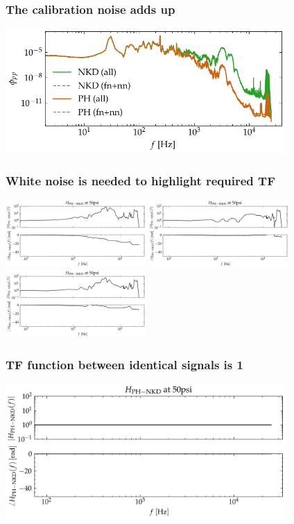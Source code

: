 \documentclass[aspectratio=169,9pt]{beamer}
\begin{document}
\begin{frame}
  \frametitle{The calibration noise adds up}
    \centering
    \includegraphics[width=0.8\textwidth]{sanity/50psi/PH-NKD/calib_spectra_50psi_nkd_fn_plus_nn.pdf}
\end{frame}

\begin{frame}
    \frametitle{White noise is needed to highlight required TF}
        \centering
        \includegraphics[width=0.4\textwidth]{sanity/50psi/PH-NKD/H_50psi_nn.png}
        \includegraphics[width=0.4\textwidth]{sanity/50psi/PH-NKD/H_50psi_fn.png}
        \includegraphics[width=0.4\textwidth]{sanity/50psi/PH-NKD/H_50psi_an.png}
\end{frame}

\begin{frame}
    \frametitle{TF function between identical signals is 1}
        \centering
        \includegraphics[width=0.8\textwidth]{sanity/50psi/PH-NKD/H_50psi_same.png}
        
\end{frame}
\end{document}
